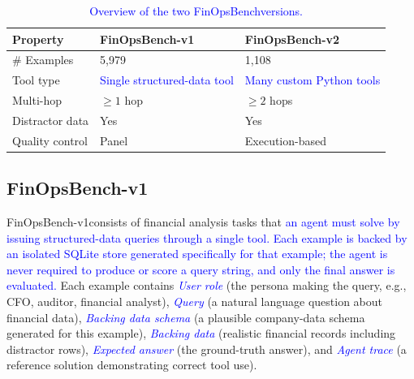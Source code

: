\documentclass[11pt]{article}
\newcommand{\edit}[1]{\textcolor{blue}{#1}}
\newcommand{\datasetname}{FinOpsBench}\xspace
\newcommand{\synthsubset}{FinOpsBench-v1}\xspace
\newcommand{\groundedfinqa}{FinOpsBench-v2}\xspace
\begin{document}
\begin{table}[t]
\centering
\footnotesize
\setlength{\tabcolsep}{3pt}
\renewcommand{\arraystretch}{1.1}
\begin{tabularx}{\columnwidth}{@{}l X X@{}}
\toprule
\textbf{Property} & \textbf{\synthsubset} & \textbf{\groundedfinqa} \\
\midrule
\# Examples & 5,979 & 1,108 \\
Tool type & \edit{Single structured-data tool} & \edit{Many custom Python tools} \\
Multi-hop & $\geq 1$ hop & $\geq 2$ hops \\
Distractor data & Yes & Yes \\
Quality control & Panel & Execution-based \\
\bottomrule
\end{tabularx}
\caption{\edit{Overview of the two \datasetname versions.}}
\label{tab:dataset_overview}
\end{table}

\subsection{\synthsubset}
\label{sec:synthsql}

\synthsubset consists of financial analysis tasks that \edit{an agent must solve by issuing structured-data queries through a single tool. Each example is backed by an isolated SQLite store generated specifically for that example; the agent is never required to produce or score a query string, and only the final answer is evaluated.} Each example contains \edit{\emph{User role}} (the persona making the query, e.g., CFO, auditor, financial analyst), \edit{\emph{Query}} (a natural language question about financial data), \edit{\emph{Backing data schema}} (a plausible company-data schema generated for this example), \edit{\emph{Backing data}} (realistic financial records including distractor rows), \edit{\emph{Expected answer}} (the ground-truth answer), and \edit{\emph{Agent trace}} (a reference solution demonstrating correct tool use).

\end{document}
